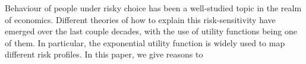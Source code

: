 Behaviour of people under risky choice has been a well-studied topic in the realm of economics. Different theories of how to explain this risk-sensitivity have emerged over the last couple decades, with the use of utility functions being one of them. In particular, the exponential utility function is widely used to map different risk profiles.
In this paper, we give reasons to 
